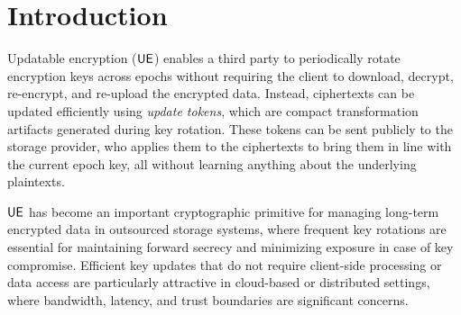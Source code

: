 \documentclass{fundam}
\begin{document}
\section{Introduction}

Updatable encryption ($\mathsf{UE}$) enables a third party to periodically rotate encryption keys across epochs without requiring the client to download, decrypt, re-encrypt, and re-upload the encrypted data. Instead, ciphertexts can be updated efficiently using \emph{update tokens}, which are compact transformation artifacts generated during key rotation. These tokens can be sent publicly to the storage provider, who applies them to the ciphertexts to bring them in line with the current epoch key, all without learning anything about the underlying plaintexts.

$\mathsf{UE}$ has become an important cryptographic primitive for managing long-term encrypted data in outsourced storage systems, where frequent key rotations are essential for maintaining forward secrecy and minimizing exposure in case of key compromise. Efficient key updates that do not require client-side processing or data access are particularly attractive in cloud-based or distributed settings, where bandwidth, latency, and trust boundaries are significant concerns.
\end{document}
